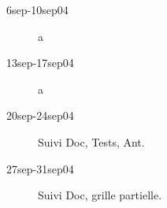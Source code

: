 \begin{description}
\item[6sep-10sep04]a

\item[13sep-17sep04]a

\item[20sep-24sep04]Suivi Doc, Tests, Ant.

\item[27sep-31sep04] Suivi Doc, grille partielle.
\end{description}
